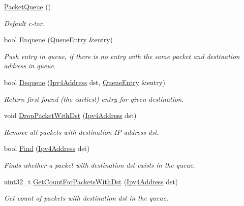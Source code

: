 \begin{DoxyCompactItemize}
\item 
\hyperlink{classns3_1_1dsdv_1_1PacketQueue_a968064ad40f8d77ab80de4577b7b1008}{Packet\+Queue} ()
\begin{DoxyCompactList}\small\item\em Default c-\/tor. \end{DoxyCompactList}\item 
bool \hyperlink{classns3_1_1dsdv_1_1PacketQueue_a21df29a3811016d2a8b45adead771410}{Enqueue} (\hyperlink{classns3_1_1dsdv_1_1QueueEntry}{Queue\+Entry} \&entry)
\begin{DoxyCompactList}\small\item\em Push entry in queue, if there is no entry with the same packet and destination address in queue. \end{DoxyCompactList}\item 
bool \hyperlink{classns3_1_1dsdv_1_1PacketQueue_a3eea5dcab62c438f2eb7d48e33869284}{Dequeue} (\hyperlink{classns3_1_1Ipv4Address}{Ipv4\+Address} dst, \hyperlink{classns3_1_1dsdv_1_1QueueEntry}{Queue\+Entry} \&entry)
\begin{DoxyCompactList}\small\item\em Return first found (the earliest) entry for given destination. \end{DoxyCompactList}\item 
void \hyperlink{classns3_1_1dsdv_1_1PacketQueue_a4e8a8e26184b37b88d54397f300edb97}{Drop\+Packet\+With\+Dst} (\hyperlink{classns3_1_1Ipv4Address}{Ipv4\+Address} dst)
\begin{DoxyCompactList}\small\item\em Remove all packets with destination IP address dst. \end{DoxyCompactList}\item 
bool \hyperlink{classns3_1_1dsdv_1_1PacketQueue_a13a16f813e0f9a67b2ab4ee3b1f10c70}{Find} (\hyperlink{classns3_1_1Ipv4Address}{Ipv4\+Address} dst)
\begin{DoxyCompactList}\small\item\em Finds whether a packet with destination dst exists in the queue. \end{DoxyCompactList}\item 
uint32\+\_\+t \hyperlink{classns3_1_1dsdv_1_1PacketQueue_a914e5328067eb95d3fc1c32eadc91bfa}{Get\+Count\+For\+Packets\+With\+Dst} (\hyperlink{classns3_1_1Ipv4Address}{Ipv4\+Address} dst)
\begin{DoxyCompactList}\small\item\em Get count of packets with destination dst in the queue. \end{DoxyCompactList}\item 

\end{DoxyCompactItemize}
